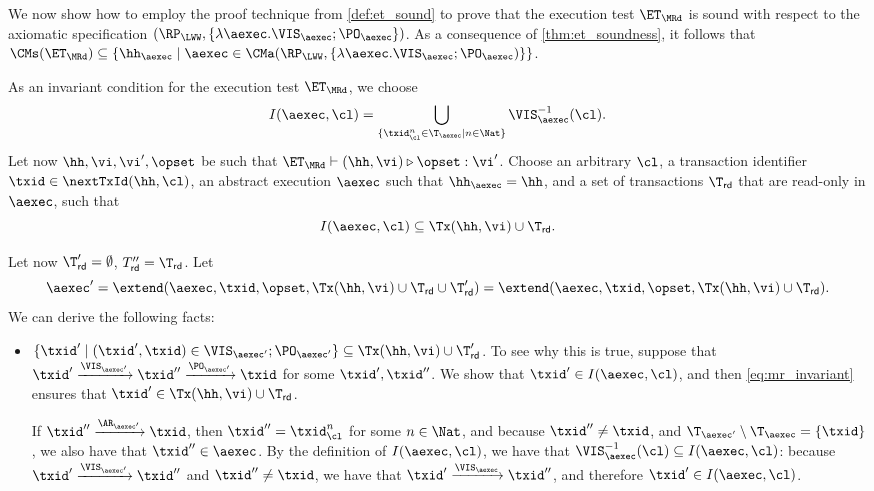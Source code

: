 \begin{example}
We now show how to employ the proof technique from \cref{def:et_sound} to prove that the execution 
test $\ET_\MRd$ is sound with respect to the axiomatic specification $(\RP_{\LWW}, \{\lambda \aexec. \VIS_{\aexec} ; \PO_{\aexec} \})$. 
As a consequence of \cref{thm:et_soundness}, it follows that $\CMs(\ET_{\MRd}) \subseteq \{ \hh_{\aexec} \mid \aexec \in \CMa(\RP_{\LWW}, 
\{\lambda \aexec. \VIS_{\aexec} ; \PO_{\aexec})\} \}$. 

As an invariant condition for the execution test $\ET_{\MRd}$, we choose 
\[
I(\aexec, \cl) = \bigcup_{\{\txid_{\cl}^{n} \in \T_{\aexec} \mid n \in \Nat\}} \VIS_{\aexec}^{-1}(\cl).
\]
Let now $\hh, \vi, \vi', \opset$ be such that $\ET_{\MRd} \vdash (\hh, \vi) \triangleright \opset: \vi'$. 
Choose an arbitrary $\cl$, a transaction identifier $\txid \in \nextTxId(\hh, \cl)$, 
an abstract execution $\aexec$ such that $\hh_{\aexec} = \hh$, and a set of 
transactions $\T_{\mathsf{rd}}$ that are read-only in $\aexec$, such that 
\begin{equation}
I(\aexec, \cl) \subseteq \Tx(\hh, \vi) \cup \T_{\mathsf{rd}}.
\label{eq:mr_invariant}
\end{equation}

Let now $\T'_{\mathsf{rd}} = \emptyset$, $T''_{\mathsf{rd}} = \T_{\mathsf{rd}}$. 
Let 
\[ 
\aexec' = \extend(\aexec, \txid, \opset, \Tx(\hh, \vi) \cup \T_{\mathsf{rd}} \cup \T'_{\mathsf{rd}}) = 
\extend(\aexec, \txid, \opset, \Tx(\hh, \vi) \cup \T_{\mathsf{rd}}).\]
We can derive the following facts:
\begin{itemize}
\item $\{\txid' \mid (\txid', \txid) \in \VIS_{\aexec'} ; \PO_{\aexec'} \} \subseteq \Tx(\hh, \vi) \cup \T'_{\mathsf{rd}}$. 
To see why this is true, suppose that $\txid' \xrightarrow{\VIS_{\aexec'}} \txid'' \xrightarrow{\PO_{\aexec'}} \txid$ 
for some $\txid', \txid''$. We show that $\txid' \in I(\aexec, \cl)$, and then \cref{eq:mr_invariant} ensures 
that $\txid' \in \Tx(\hh, \vi) \cup \T_{\mathsf{rd}}$. 

If $\txid'' \xrightarrow{\AR_{\aexec'}} \txid$, then $\txid'' = \txid_{\cl}^{n}$ for some $n \in \Nat$, 
and because $\txid'' \neq \txid$, and $\T_{\aexec'} \setminus \T_{\aexec} = \{ \txid \}$, we also 
have that $\txid'' \in \aexec$. By the definition of $I(\aexec, \cl)$, we have that $\VIS^{-1}_{\aexec}(\cl) \subseteq 
I(\aexec, \cl)$: because $\txid' \xrightarrow{\VIS_{\aexec'}} \txid''$ and $\txid'' \neq \txid$, we have 
that $\txid' \xrightarrow{\VIS_{\aexec}} \txid''$, and therefore $\txid' \in I(\aexec, \cl)$. 


\end{itemize}
\end{example}
